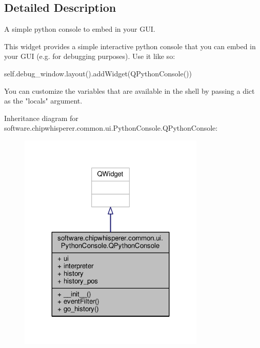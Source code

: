 \subsection{Detailed Description}
\begin{DoxyVerb}A simple python console to embed in your GUI.

This widget provides a simple interactive python console that you can
embed in your GUI (e.g. for debugging purposes). Use it like so:

self.debug_window.layout().addWidget(QPythonConsole())

You can customize the variables that are available in the shell by
passing a dict as the "locals" argument.
\end{DoxyVerb}
 

Inheritance diagram for software.\+chipwhisperer.\+common.\+ui.\+Python\+Console.\+Q\+Python\+Console\+:\nopagebreak
\begin{figure}[H]
\begin{center}
\leavevmode
\includegraphics[width=251pt]{d8/d05/classsoftware_1_1chipwhisperer_1_1common_1_1ui_1_1PythonConsole_1_1QPythonConsole__inherit__graph}
\end{center}
\end{figure}


